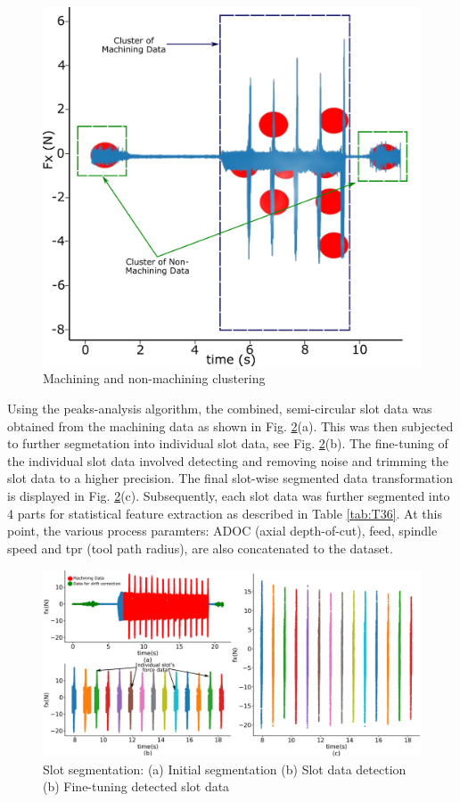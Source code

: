 \documentclass[preprint,review,12pt]{elsarticle}
\begin{document}
\begin{figure}[!h]
\begin{center}
\includegraphics[width=0.7\linewidth]{310.png}
\caption{Machining and non-machining clustering}\label{fig:fig310}
\end{center}
\end{figure}

Using the peaks-analysis algorithm, the combined, semi-circular slot data was obtained from the machining data as shown in Fig. \ref{fig:fig312}(a). This was then subjected to further segmetation into individual slot data, see Fig. \ref{fig:fig312}(b). The fine-tuning of the individual slot data involved detecting and removing noise and trimming the slot data to a higher precision. The final slot-wise segmented data transformation is displayed in Fig. \ref{fig:fig312}(c). Subsequently, each slot data was further segmented into 4 parts for statistical feature extraction as described in Table \ref{tab:T36}. At this point, the various process paramters: ADOC (axial depth-of-cut), feed, spindle speed and tpr (tool path radius), are also concatenated to the dataset. \par

 \begin{figure}[!h]
   \begin{center}
     \includegraphics[width=\linewidth]{312.png}
     \caption{Slot segmentation: (a) Initial segmentation (b) Slot data detection (b) Fine-tuning detected slot data}\label{fig:fig312}
   \end{center}
 \end{figure}
\end{document}
